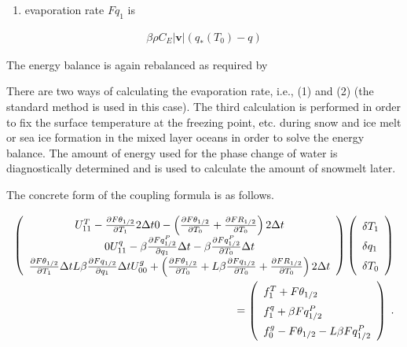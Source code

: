 \begin{enumerate}
\def\labelenumi{\arabic{enumi}.}
\setcounter{enumi}{1}
\tightlist
\item
  evaporation rate \(Fq_1\) is
\end{enumerate}

\begin{eqnarray}
        \beta \rho C_E |{\mathbf{v}}| ( q_*(T_0) - q )
\end{eqnarray}

The energy balance is again rebalanced as required by

There are two ways of calculating the evaporation rate, i.e., (1) and
(2) (the standard method is used in this case). The third calculation is
performed in order to fix the surface temperature at the freezing point,
etc. during snow and ice melt or sea ice formation in the mixed layer
oceans in order to solve the energy balance. The amount of energy used
for the phase change of water is diagnostically determined and is used
to calculate the amount of snowmelt later.

The concrete form of the coupling formula is as follows.

\begin{eqnarray}
  \renewcommand{\arraystretch}{1.5}
  \left( \begin{array}{ccc}
      U_{11}^T - \frac{\partial{F\theta_{1/2}}}{\partial {T_1}} 2 \Delta t
      0
      - \left( \frac{\partial{F\theta_{1/2}}}{\partial {T_0}}
                         + \frac{\partial{FR_{1/2}}}{\partial {T_0}}\right) 2 \Delta t \\
      0
      U_{11}^q - \beta \frac{\partial{Fq^P_{1/2}}}{\partial {q_1}} \Delta t
      - \beta \frac{\partial{Fq^P_{1/2}}}{\partial {T_0}} \Delta t \\
        \frac{\partial{F\theta_{1/2}}}{\partial {T_1}} \Delta t
      L \beta \frac{\partial{Fq_{1/2}}}{\partial {q_1}} \Delta t
      U_{00}^g + \left(\frac{\partial{F\theta_{1/2}}}{\partial {T_0}}
                + L \beta \frac{\partial{Fq_{1/2}}}{\partial {T_0}}
                + \frac{\partial{FR_{1/2}}}{\partial {T_0}} \right) 2 \Delta t \\
  \end{array} \right)
  \left( \begin{array}{l}
      \delta T_1 \\ \delta q_1 \\ \delta T_0 \\
  \end{array} \right)   \\
=  \left( \begin{array}{l}
      f_1^T + F\theta_{1/2} \\
      f_1^q + \beta Fq^P_{1/2} \\
      f_0^g - F\theta_{1/2} - L \beta Fq^P_{1/2} \\
  \end{array} \right) \; .
\end{eqnarray}

